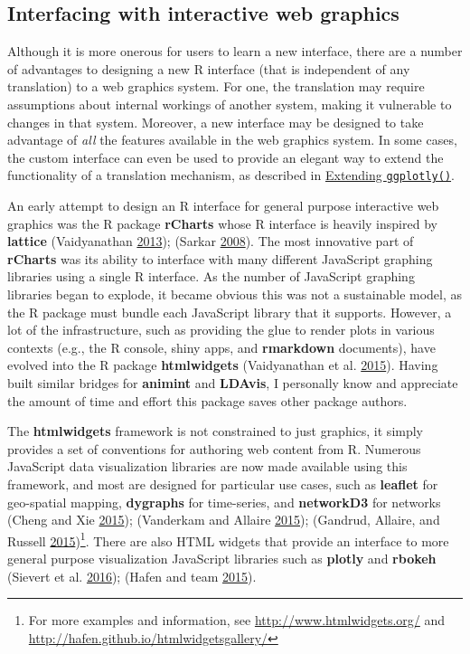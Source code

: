 \documentclass[12pt,]{isuthesis}
\let\rmarkdownfootnote\footnote%
\def\footnote{\protect\rmarkdownfootnote}
\begin{document}
\hypertarget{interfacing-with-interactive-web-graphics}{\subsection{Interfacing
with interactive web
graphics}\label{interfacing-with-interactive-web-graphics}}

Although it is more onerous for users to learn a new interface, there
are a number of advantages to designing a new R interface (that is
independent of any translation) to a web graphics system. For one, the
translation may require assumptions about internal workings of another
system, making it vulnerable to changes in that system. Moreover, a new
interface may be designed to take advantage of \emph{all} the features
available in the web graphics system. In some cases, the custom
interface can even be used to provide an elegant way to extend the
functionality of a translation mechanism, as described in
\protect\hyperlink{extending-ggplotlyux28ux29}{Extending
\texttt{ggplotly()}}.

An early attempt to design an R interface for general purpose
interactive web graphics was the R package \textbf{rCharts} whose R
interface is heavily inspired by \textbf{lattice} (Vaidyanathan
\protect\hyperlink{ref-rCharts}{2013}); (Sarkar
\protect\hyperlink{ref-lattice}{2008}). The most innovative part of
\textbf{rCharts} was its ability to interface with many different
JavaScript graphing libraries using a single R interface. As the number
of JavaScript graphing libraries began to explode, it became obvious
this was not a sustainable model, as the R package must bundle each
JavaScript library that it supports. However, a lot of the
infrastructure, such as providing the glue to render plots in various
contexts (e.g., the R console, shiny apps, and \textbf{rmarkdown}
documents), have evolved into the R package \textbf{htmlwidgets}
(Vaidyanathan et al. \protect\hyperlink{ref-htmlwidgets}{2015}). Having
built similar bridges for \textbf{animint} and \textbf{LDAvis}, I
personally know and appreciate the amount of time and effort this
package saves other package authors.

The \textbf{htmlwidgets} framework is not constrained to just graphics,
it simply provides a set of conventions for authoring web content from
R. Numerous JavaScript data visualization libraries are now made
available using this framework, and most are designed for particular use
cases, such as \textbf{leaflet} for geo-spatial mapping,
\textbf{dygraphs} for time-series, and \textbf{networkD3} for networks
(Cheng and Xie \protect\hyperlink{ref-leaflet}{2015}); (Vanderkam and
Allaire \protect\hyperlink{ref-dygraphs}{2015}); (Gandrud, Allaire, and
Russell \protect\hyperlink{ref-networkD3}{2015})\footnote{For more
  examples and information, see \url{http://www.htmlwidgets.org/} and
  \url{http://hafen.github.io/htmlwidgetsgallery/}}. There are also HTML
widgets that provide an interface to more general purpose visualization
JavaScript libraries such as \textbf{plotly} and \textbf{rbokeh}
(Sievert et al. \protect\hyperlink{ref-plotly}{2016}); (Hafen and team
\protect\hyperlink{ref-rbokeh}{2015}).
\end{document}
